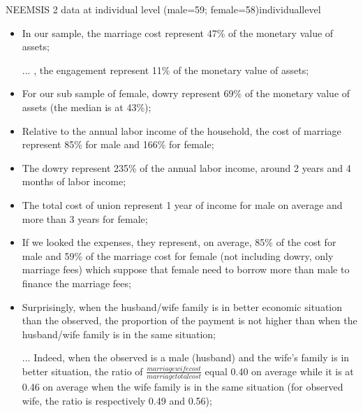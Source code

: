 \documentclass[a4paper, 11pt, onecolumn]{article}
\begin{document}
\begin{greybox}{NEEMSIS 2 data at individual level (male=59; female=58)}{individuallevel}
\begin{itemize}[leftmargin=*]
\item In our sample, the marriage cost represent 47\% of the monetary value of assets;
\item [...], the engagement represent 11\% of the monetary value of assets;
\item For our sub sample of female, dowry represent 69\% of the monetary value of assets (the median is at 43\%);
\item Relative to the annual labor income of the household, the cost of marriage represent 85\% for male and 166\% for female;
\item The dowry represent 235\% of the annual labor income, around 2 years and 4 months of labor income;
\item The total cost of union represent 1 year of income for male on average and more than 3 years for female;
\item If we looked the expenses, they represent, on average, 85\% of the cost for male and 59\% of the marriage cost for female  (not including dowry, only marriage fees) which suppose that female need to borrow more than male to finance the marriage fees;
\item Surprisingly, when the husband/wife family is in better economic situation than the observed, the proportion of the payment is not higher than when the husband/wife family is in the same situation;
\item [...] Indeed, when the observed is a male (husband) and the wife's family is in better situation, the ratio of $\frac{marriage wife cost}{marriage total cost}$ equal 0.40 on average while it is at 0.46 on average when the wife family is in the same situation (for observed wife, the ratio is respectively 0.49 and 0.56);

\end{itemize}
\end{greybox}
\end{document}
